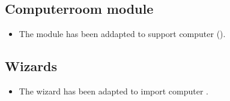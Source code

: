 



\subsection{Computerroom module}
\begin{itemize}
\item The  module has been addapted to support  computer ().
\end{itemize}

\subsection{Wizards}
\begin{itemize}
\item The  wizard has been adapted to import  computer .
\end{itemize}



